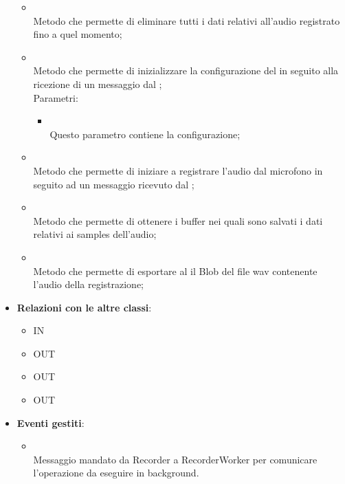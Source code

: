 \begin{itemize}
\begin{itemize}
		\item[]  \\
		Metodo che permette di eliminare tutti i dati relativi all'audio registrato fino a quel momento;\\
		\item[]  \\
		Metodo che permette di inizializzare la configurazione del  in seguito alla ricezione di un messaggio dal ;\\
		Parametri:
		\begin{itemize}
			\item {} \\
			Questo parametro contiene la configurazione;
		\end{itemize}
		\item[]  \\
		Metodo che permette di iniziare a registrare l'audio dal microfono in seguito ad un messaggio ricevuto dal ;\\
		\item[]  \\
		Metodo che permette di ottenere i buffer nei quali sono salvati i dati relativi ai samples dell'audio;\\
		\item[]  \\
		Metodo che permette di esportare al  il Blob del file wav contenente l'audio della registrazione;\\
	\end{itemize}
	\item \textbf{Relazioni con le altre classi}:
	\begin{itemize}
		\item IN \hyperlink{Recorder_label}{}
		\item OUT \hyperlink{RecorderWorkerConfig_label}{}
		\item OUT \hyperlink{RecorderWorkerMsg_label}{}
		\item OUT \hyperlink{RecorderMsg_label}{}
	\end{itemize}
	\item \textbf{Eventi gestiti}:
	\begin{itemize}
\item {} \\ Messaggio mandato da Recorder a RecorderWorker per comunicare l'operazione da eseguire in background.	\end{itemize}
\end{itemize}

